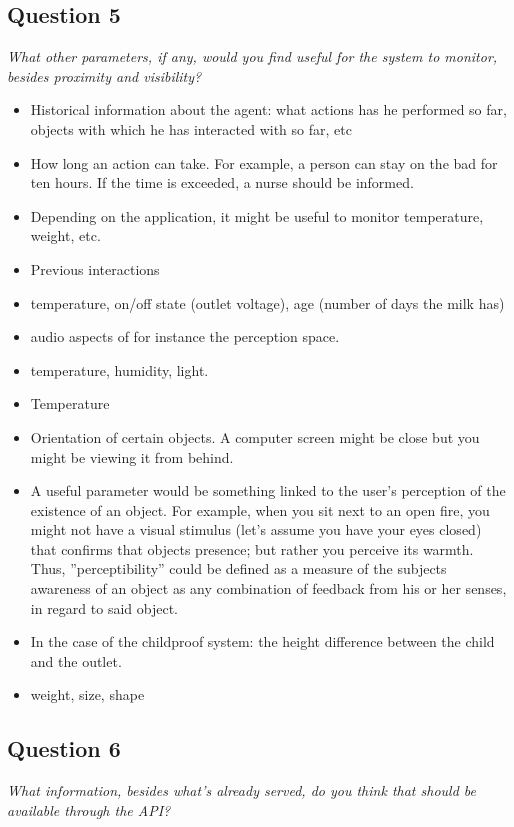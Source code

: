 \subsection{Question 5}\label{question2:5}
\emph{What other parameters, if any, would you find useful for the system to monitor, besides proximity and visibility?}

\begin{itemize}
	\item Historical information about the agent: what actions has he performed so far, objects with which he has interacted with so far, etc
	\item How long an action can take. For example, a person can stay on the bad for ten hours. If the time is exceeded, a nurse should be informed.
	\item Depending on the application, it might be useful to monitor temperature, weight, etc.
	\item Previous interactions
	\item temperature, on/off state (outlet voltage), age (number of days the milk has)
	\item audio aspects of for instance the perception space.
	\item temperature, humidity, light.
	\item Temperature
	\item Orientation of certain objects. A computer screen might be close but you might be viewing it from behind.
	\item A useful parameter would be something linked to the user's perception of the existence of an object. For example, when you sit next to an open fire, you might not have a visual stimulus (let's assume you have your eyes closed) that confirms that objects presence; but rather you perceive its warmth. Thus, ''perceptibility'' could be defined as a measure of the subjects awareness of an object as any combination of feedback from his or her senses, in regard to said object.
	\item In the case of the childproof system: the height difference between the child and the outlet.
	\item weight, size, shape
\end{itemize}

\subsection{Question 6}\label{question2:6}
\emph{What information, besides what's already served, do you think that should be available through the API?}

